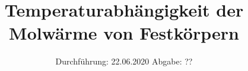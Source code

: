 

\subject{Nr. 47}
\title{Temperaturabhängigkeit der Molwärme von Festkörpern}
\date{%
  Durchführung: 22.06.2020
  \hspace{3em}
  Abgabe: ??
}



\maketitle
\thispagestyle{empty}
\tableofcontents
\newpage






\printbibliography{}


